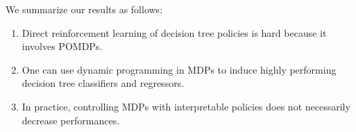 
We summarize our results as follows:

\begin{enumerate}
    \item Direct reinforcement learning of decision tree policies is hard because it involves POMDPs.
    \item One can use dynamic programming in MDPs to induce highly performing decision tree classifiers and regressors.
    \item In practice, controlling MDPs with interpretable policies does not necessarily decrease performances.
\end{enumerate}

        
        
        
